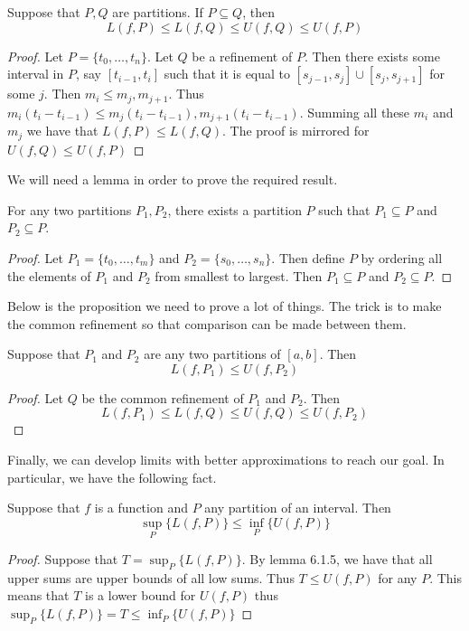 \begin{prp}{}{} Suppose that $P,Q$ are partitions. If $P\subseteq Q$, then $$L(f,P)\leq L(f,Q)\leq U(f,Q)\leq U(f,P)$$ \tcbline
\begin{proof} Let $P=\{t_0,\dots,t_n\}$. Let $Q$ be a refinement of $P$. Then there exists some interval in $P$, say $[t_{i-1},t_i]$ such that it is equal to $[s_{j-1},s_j]\cup[s_j,s_{j+1}]$ for some $j$. Then $m_i\leq m_j,m_{j+1}$. Thus $m_i(t_i-t_{i-1})\leq m_j(t_i-t_{i-1}),m_{j+1}(t_i-t_{i-1})$. Summing all these $m_i$ and $m_j$ we have that $L(f,P)\leq L(f,Q)$. The proof is mirrored for $U(f,Q)\leq U(f,P)$
\end{proof}
\end{prp}

We will need a lemma in order to prove the required result. 

\begin{lmm}{}{} For any two partitions $P_1,P_2$, there exists a partition $P$ such that $P_1\subseteq P$ and $P_2\subseteq P$. \tcbline
\begin{proof} Let $P_1=\{t_0,\dots,t_m\}$ and $P_2=\{s_0,\dots,s_n\}$. Then define $P$ by ordering all the elements of $P_1$ and $P_2$ from smallest to largest. Then $P_1\subseteq P$ and $P_2\subseteq P$. 
\end{proof}
\end{lmm}

Below is the proposition we need to prove a lot of things. The trick is to make the common refinement so that comparison can be made between them. 

\begin{prp}{}{} Suppose that $P_1$ and $P_2$ are any two partitions of $[a,b]$. Then $$L(f,P_1)\leq U(f,P_2)$$ \tcbline
\begin{proof} Let $Q$ be the common refinement of $P_1$ and $P_2$. Then $$L(f,P_1)\leq L(f,Q)\leq U(f,Q)\leq U(f,P_2)$$
\end{proof}
\end{prp}

Finally, we can develop limits with better approximations to reach our goal. In particular, we have the following fact. 

\begin{lmm}{}{} Suppose that $f$ is a function and $P$ any partition of an interval. Then $$\sup_P\{L(f,P)\}\leq\inf_P\{U(f,P)\}$$ \tcbline
\begin{proof} Suppose that $T=\sup_P\{L(f,P)\}$. By lemma 6.1.5, we have that all upper sums are upper bounds of all low sums. Thus $T\leq U(f,P)$ for any $P$. This means that $T$ is a lower bound for $U(f,P)$ thus $\sup_P\{L(f,P)\}=T\leq\inf_P\{U(f,P)\}$
\end{proof}
\end{lmm}


